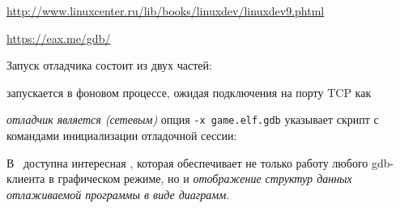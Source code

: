 \url{http://www.linuxcenter.ru/lib/books/linuxdev/linuxdev9.phtml}

\url{https://eax.me/gdb/}

\medskip\noindent
Запуск отладчика состоит из двух частей:
\begin{description}[nosep]
\item[qemu] запускается в фоновом процессе, ожидая подключения на порту TCP
 как 
\item[gdb] \emph{отладчик является (сетевым) }
опция \verb|-x game.elf.gdb| указывает скрипт с командами инициализации
отладочной сессии:
\end{description}

\clearpage
{}

В \linux\ доступна интересная  , которая
обеспечивает не только работу любого gdb-клиента в графическом режиме, но и
\emph{отображение структур данных отлаживаемой программы в виде диаграмм}.


\clearpage
{}
\clearpage
{}
\clearpage
{}

\clearpage
{}


\secup

